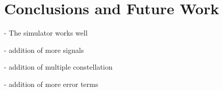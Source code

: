 \documentclass[12pt]{report}
\begin{document}
\chapter{Conclusions and Future Work}
- The simulator works well 

- addition of more signals

- addition of multiple constellation

- addition of more error terms





    
    




\end{document}
